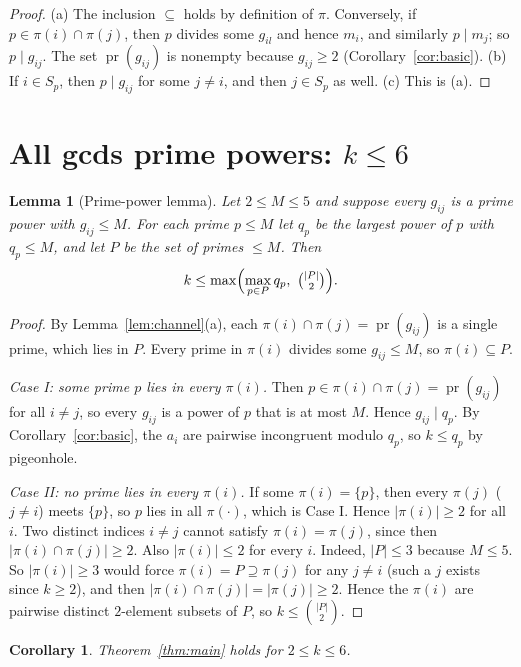 \documentclass[11pt]{article}
\newtheorem{lemma}[theorem]{Lemma}
\newtheorem{corollary}[theorem]{Corollary}
\theoremstyle{remark}
\theoremstyle{definition}
\newcommand{\pr}{\operatorname{pr}}
\begin{document}
\begin{proof}
(a) The inclusion $\subseteq$ holds by definition of $\pi$. Conversely, if $p\in\pi(i)\cap\pi(j)$,
then $p$ divides some $g_{il}$ and hence $m_i$, and similarly $p\mid m_j$; so $p\mid g_{ij}$. The set
$\pr(g_{ij})$ is nonempty because $g_{ij}\ge2$ (Corollary~\ref{cor:basic}).
(b) If $i\in S_p$, then $p\mid g_{ij}$ for some $j\ne i$, and then $j\in S_p$ as well.
(c) This is (a).
\end{proof}

\section{All gcds prime powers: $k\le 6$}

\begin{lemma}[Prime-power lemma]\label{lem:pp}
Let $2\le M\le5$ and suppose every $g_{ij}$ is a prime power with $g_{ij}\le M$. For each prime
$p\le M$ let $q_p$ be the largest power of $p$ with $q_p\le M$, and let $P$ be the set of primes
$\le M$. Then
\[
  k\le\max\Bigl(\max_{p\in P}q_p,\ \tbinom{|P|}{2}\Bigr).
\]
\end{lemma}

\begin{proof}
By Lemma~\ref{lem:channel}(a), each $\pi(i)\cap\pi(j)=\pr(g_{ij})$ is a single prime, which lies in $P$.
Every prime in $\pi(i)$ divides some $g_{ij}\le M$, so $\pi(i)\subseteq P$.

\emph{Case I: some prime $p$ lies in every $\pi(i)$.} Then $p\in\pi(i)\cap\pi(j)=\pr(g_{ij})$ for all $i\ne j$,
so every $g_{ij}$ is a power of $p$ that is at most $M$. Hence $g_{ij}\mid q_p$. By
Corollary~\ref{cor:basic}, the $a_i$ are pairwise incongruent modulo $q_p$, so $k\le q_p$ by pigeonhole.

\emph{Case II: no prime lies in every $\pi(i)$.} If some $\pi(i)=\{p\}$, then every $\pi(j)$ ($j\ne i$) meets
$\{p\}$, so $p$ lies in all $\pi(\cdot)$, which is Case I. Hence $|\pi(i)|\ge2$ for all $i$. Two distinct
indices $i\ne j$ cannot satisfy $\pi(i)=\pi(j)$, since then $|\pi(i)\cap\pi(j)|\ge2$. Also
$|\pi(i)|\le2$ for every $i$. Indeed, $|P|\le3$ because $M\le5$. So $|\pi(i)|\ge3$ would force
$\pi(i)=P\supseteq\pi(j)$ for any $j\ne i$ (such a $j$ exists since $k\ge2$), and then
$|\pi(i)\cap\pi(j)|=|\pi(j)|\ge2$. Hence the $\pi(i)$ are pairwise distinct $2$-element subsets
of $P$, so $k\le\binom{|P|}{2}$.
\end{proof}

\begin{corollary}\label{cor:k56}
Theorem~\ref{thm:main} holds for $2\le k\le6$.
\end{corollary}
\end{document}
